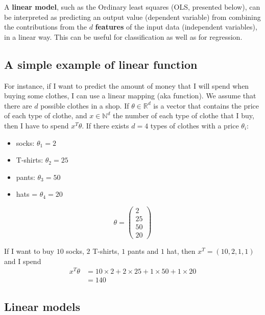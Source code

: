 \documentclass[
10pt, %
a4paper, %
oneside, %
headinclude,footinclude, %
BCOR5mm, %
]{scrartcl}
\begin{document}
A \textbf{{linear model}}, such as the Ordinary least squares (OLS, presented below), can be interpreted as
predicting an output value (dependent variable) from combining the contributions from the $d$
\textbf{{features}} of the input data (independent variables), in a linear
way. This can be useful for classification as well as for regression.

\subsection{A simple example of linear function}%

For instance, if I want to predict the amount of money that I will spend when
buying some clothes, I can use a linear mapping (aka function). We assume that there are $d$ possible clothes in a shop. If $\theta\in \mathbb{R}^d$ is a vector that contains the price
of each type of clothe, and $x\in\mathbb{N}^d$ the number of each type of clothe that I buy,
then I have to spend $x^T\theta$. If there exists $d=4$ types of clothes with a
price $\theta_i$:
\begin{itemize}
    \item socks: $\theta_1=2$
    \item T-shirts: $\theta_2=25$
    \item pants: $\theta_3 = 50$
    \item hats = $\theta_4 = 20$
\end{itemize}

\begin{equation*}
\theta=\begin{pmatrix}
2\\
25\\
50\\
20
\end{pmatrix}
\end{equation*}

If I want to buy $10$ socks, $2$ T-shirts, $1$ pants and $1$ hat, then $x^T=(10,
2, 1, 1)$ and I spend
\begin{equation}
    \begin{aligned}
        \label{eq:}
        x^T\theta &= 10\times 2 + 2\times 25 + 1\times 50 + 1\times 20\\
        &= 140
    \end{aligned}
\end{equation}

\subsection{Linear models}
\end{document}
